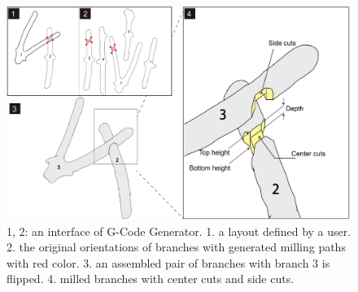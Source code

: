 \begin{figure}[h]
	\begin{center}
		\includegraphics[width = 0.4\paperwidth]{images/system/joint_diagram.pdf}
		\caption{1, 2: an interface of G-Code Generator. 1. a layout defined by a user. 2. the original orientations of branches with generated milling paths with red color. 3. an assembled pair of branches with branch 3 is flipped. 4. milled branches with center cuts and side cuts.}
		\label{fig:joint_geometry}
	\end{center}
\end{figure}




